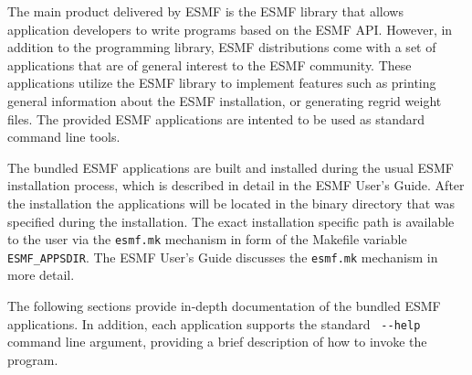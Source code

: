 
The main product delivered by ESMF is the ESMF library that allows application
developers to write programs based on the ESMF API. However, in addition to the
programming library, ESMF distributions come with a set of applications that are
of general interest to the ESMF community. These applications utilize the ESMF
library to implement features such as printing general information about the
ESMF installation, or generating regrid weight files. The provided ESMF
applications are intented to be used as standard command line tools.

The bundled ESMF applications are built and installed during the usual ESMF
installation process, which is described in detail in the ESMF User's Guide. 
After the installation the applications will be located in the binary directory
that was specified during the installation. The exact installation specific
path is available to the user via the {\tt esmf.mk} mechanism in form of the
Makefile variable {\tt ESMF\_APPSDIR}. The ESMF User's Guide discusses the
{\tt esmf.mk} mechanism in more detail.

The following sections provide in-depth documentation of the bundled ESMF
applications. In addition, each application supports the standard \verb+ --help + command line argument, providing a brief description of how to invoke
the program.

